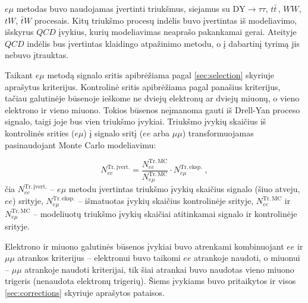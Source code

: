 \documentclass[a4paper, 12pt]{article}
\newcommand{\emu}{e\mu}
\newcommand{\DYtau}{\mathrm{DY} \! \rightarrow \! \tau\tau}
\newlength\q
\begin{document}
$\emu$ metodas buvo naudojamas įvertinti triukšmus, siejamus su $\DYtau$, $t\bar{t}\,$, $WW$,
$tW$, $\bar{t}W$ procesais.
Kitų triukšmo procesų indėlis buvo įvertintas iš modeliavimo, išskyrus $QCD$ įvykius, kurių modeliavimas
neaprašo pakankamai gerai.
Ateityje $QCD$ indėlis bus įvertintas klaidingo atpažinimo metodu, o į dabartinį tyrimą jis nebuvo įtrauktas.

Taikant $\emu$ metodą signalo sritis apibrėžiama pagal \ref{sec:selection} skyriuje aprašytus kriterijus.
Kontrolinė sritis apibrėžiama pagal panašius kriterijus, tačiau galutinėje būsenoje ieškome
ne dviejų elektronų ar dviejų miuonų, o vieno elektrono ir vieno miuono.
Tokios būsenos neįmanoma gauti iš Drell-Yan proceso signalo, taigi joje bus vien triukšmo įvykiai.
Triukšmo įvykių skaičius iš kontrolinės srities ($\emu$) į signalo sritį ($ee$ arba $\mu\mu$)
transformuojamas pasinaudojant Monte Carlo modeliavimu:

\begin{equation}
	N_{ee}^{\mathrm{Tr. \, įvert.}} =
	\frac{ N_{ee}^{\mathrm{Tr. \, MC}} }{ N_{e\mu}^{\mathrm{Tr. \, MC}} }
	\cdot N_{e\mu}^{\mathrm{Tr. \, eksp.}} \; ,
	\label{eq:emuMethod}
\end{equation}
čia $N_{ee}^{\mathrm{Tr. \, įvert.}}$ -- $\emu$ metodu įvertintas triukšmo įvykių skaičius signalo
(šiuo atveju, $ee$) srityje, $N_{e\mu}^{\mathrm{Tr. \, eksp.}}$ -- išmatuotas įvykių skaičius
kontrolinėje srityje, $N_{ee}^{\mathrm{Tr. \, MC}}$ ir $N_{e\mu}^{\mathrm{Tr. \, MC}}$ -- modeliuotų
triukšmo įvykių skaičiai atitinkamai signalo ir kontrolinėje srityje.

Elektrono ir miuono galutinės būsenos įvykiai buvo atrenkami kombinuojant $ee$ ir $\mu\mu$ atrankos
kriterijus -- elektronui buvo taikomi $ee$ atrankoje naudoti, o miuonui -- $\mu\mu$ atrankoje naudoti
kriterijai, tik šiai atrankai buvo naudotas vieno miuono trigeris (nenaudota elektronų trigerių).
Šiems įvykiams buvo pritaikytos ir visos \ref{sec:corrections} skyriuje aprašytos pataisos.
\end{document}
